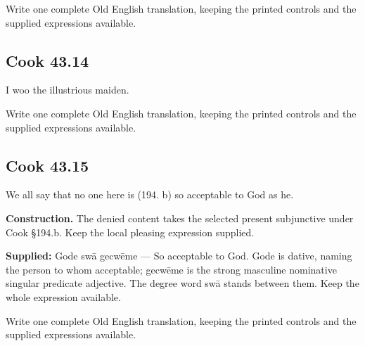 Write one complete Old English translation, keeping the printed controls and the supplied expressions available.

\par\begin{minipage}{\linewidth}\raggedright
\subsection*{Cook 43.14}

I woo the illustrious maiden.

Write one complete Old English translation, keeping the printed controls and the supplied expressions available.

\end{minipage}\par\addvspace{4pt}

\par\begin{minipage}{\linewidth}\raggedright
\subsection*{Cook 43.15}

We all say that no one here is (194. b) so acceptable to God as he.

\textbf{Construction.} The denied content takes the selected present subjunctive under Cook §194.b. Keep the local pleasing expression supplied.

\end{minipage}\par\addvspace{4pt}

\textbf{Supplied:} Gode swā gecwēme — So acceptable to God. Gode is dative, naming the person to whom acceptable; gecwēme is the strong masculine nominative singular predicate adjective. The degree word swā stands between them. Keep the whole expression available.

Write one complete Old English translation, keeping the printed controls and the supplied expressions available.

